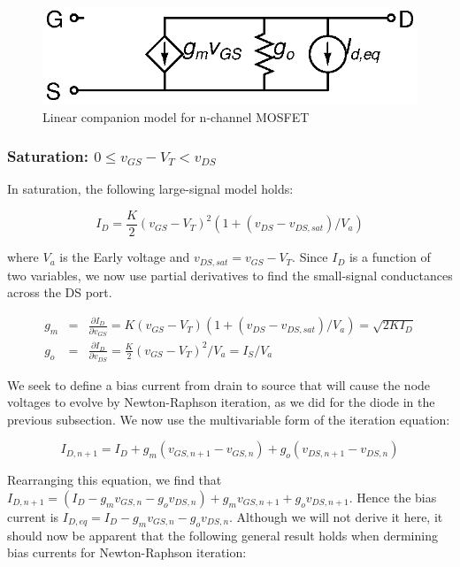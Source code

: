 \documentclass{article}
\begin{document}
\begin{figure}[h]
\begin{center}
\includegraphics{fig/nmos.eps}
\caption{Linear companion model for n-channel MOSFET \label{fig:nmos}}
\end{center}
\end{figure}

\subsubsection{Saturation: $ 0 \leq v_{GS} - V_T < v_{DS} $}

In saturation, the following large-signal model holds:

\begin{equation}
I_D=\frac{K}{2}(v_{GS}-V_T)^2 (1+(v_{DS}-v_{DS,sat})/V_a)
\end{equation}

where $V_a$ is the Early voltage and  $v_{DS,sat}=v_{GS}-V_T$.  Since $I_D$ is a function of two variables, we now use partial derivatives to find the small-signal conductances across the DS port.

\begin{eqnarray}
g_m&=&\frac{\partial I_D}{\partial v_{GS}}=K(v_{GS}-V_T)(1+(v_{DS}-v_{DS,sat})/V_a)=\sqrt{2KI_D} \\
g_o&=&\frac{\partial I_D}{\partial v_{DS}}=\frac{K}{2}(v_{GS}-V_T)^2 / V_a=I_S/V_a
\end{eqnarray}

We seek to define a bias current from drain to source that will cause the node voltages to evolve by Newton-Raphson iteration, as we did for the diode in the previous subsection.  We now use the multivariable form of the iteration equation:

\begin{equation}
I_{D,n+1}=I_D+g_m(v_{GS,n+1}-v_{GS,n})+g_o(v_{DS,n+1}-v_{DS,n})
\end{equation}

Rearranging this equation, we find that $I_{D,n+1}=(I_D-g_mv_{GS,n}-g_ov_{DS,n})+g_mv_{GS,n+1}+g_ov_{DS,n+1}$.  Hence the bias current is $I_{D,eq}=I_D-g_mv_{GS,n}-g_ov_{DS,n}$.  Although we will not derive it here, it should now be apparent that the following general result holds when dermining bias currents for Newton-Raphson iteration:
\end{document}

